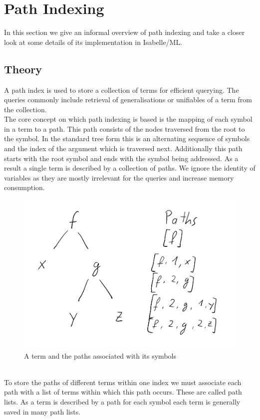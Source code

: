 \chapter{Path Indexing}
In this section we give an informal overview of path indexing and take a closer look at some details of its implementation in Isabelle/ML.\\
\section{Theory}
A path index is used to store a collection of terms for efficient querying. The queries commonly include retrieval of generalisations or unifiables of a term from the collection.\\
The core concept on which path indexing is based is the mapping of each symbol in a term to a path. This path consists of the nodes traversed from the root to the symbol. In the standard tree form this is an alternating sequence of symbols and the index of the argument which is traversed next. Additionally this path starts with the root symbol and ends with the symbol being addressed. As a result a single term is described by a collection of paths. We ignore the identity of variables as they are mostly irrelevant for the queries and increase memory consumption.\\
\begin{figure}[h]
\centering
\includegraphics[scale=0.25]{figures/term_path.png}
\caption{A term and the paths associated with its symbols}
\end{figure}\\
To store the paths of different terms within one index we must associate each path with a list of terms within which this path occurs. These are called path lists. As a term is described by a path for each symbol each term is generally saved in many path lists.\\
